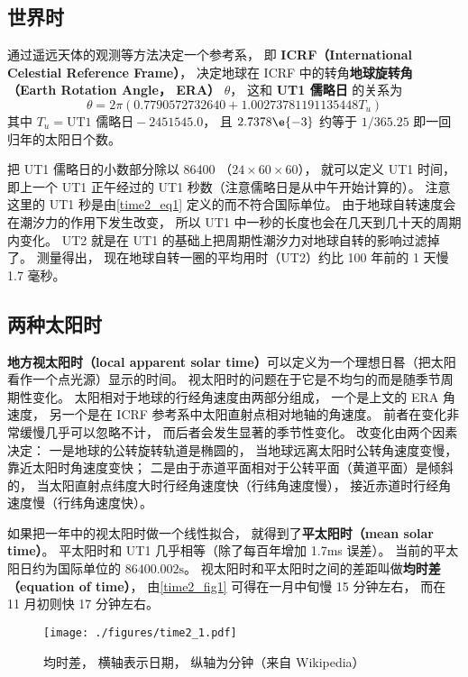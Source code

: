 

\subsection{世界时}
通过遥远天体的观测等方法决定一个参考系， 即 \textbf{ICRF（International Celestial Reference Frame）}， 决定地球在 ICRF 中的转角\textbf{地球旋转角（Earth Rotation Angle， ERA）} $\theta$， 这和 \textbf{UT1 儒略日} 的关系为
\begin{equation}\label{time2_eq1}
\theta = 2\pi(0.7790572732640 + 1.00273781191135448 T_u)
\end{equation}
其中 $T_u = \text{UT1 儒略日} - 2451545.0$， 且 $2.7378\e{-3}$ 约等于 $1/365.25$ 即一回归年的太阳日个数。

把 UT1 儒略日的小数部分除以 86400 （$24\times 60\times 60$）， 就可以定义 UT1 时间， 即上一个 UT1 正午经过的 UT1 秒数（注意儒略日是从中午开始计算的）。 注意这里的 UT1 秒是由\autoref{time2_eq1} 定义的而不符合国际单位。 由于地球自转速度会在潮汐力的作用下发生改变， 所以 UT1 中一秒的长度也会在几天到几十天的周期内变化。 UT2 就是在 UT1 的基础上把周期性潮汐力对地球自转的影响过滤掉了。 测量得出， 现在地球自转一圈的平均用时（UT2）约比 100 年前的 1 天慢 1.7 毫秒。

\subsection{两种太阳时}
\textbf{地方视太阳时（local apparent solar time）}可以定义为一个理想日晷（把太阳看作一个点光源）显示的时间。 视太阳时的问题在于它是不均匀的而是随季节周期性变化。 太阳相对于地球的行经角速度由两部分组成， 一个是上文的 ERA 角速度， 另一个是在 ICRF 参考系中太阳直射点相对地轴的角速度。 前者在变化非常缓慢几乎可以忽略不计， 而后者会发生显著的季节性变化。 改变化由两个因素决定： 一是地球的公转旋转轨道是椭圆的， 当地球远离太阳时公转角速度变慢， 靠近太阳时角速度变快； 二是由于赤道平面相对于公转平面（黄道平面）是倾斜的， 当太阳直射点纬度大时行经角速度快（行纬角速度慢）， 接近赤道时行经角速度慢（行纬角速度快）。

如果把一年中的视太阳时做一个线性拟合， 就得到了\textbf{平太阳时（mean solar time）}。 平太阳时和 UT1 几乎相等（除了每百年增加 1.7ms 误差）。 当前的平太阳日约为国际单位的 $86400.002\mathrm{s}$。 视太阳时和平太阳时之间的差距叫做\textbf{均时差（equation of time）}， 由\autoref{time2_fig1} 可得在一月中旬慢 15 分钟左右， 而在 11 月初则快 17 分钟左右。

\begin{figure}[ht]
\centering
\texttt{[image: ./figures/time2\_1.pdf]}
\caption{均时差， 横轴表示日期， 纵轴为分钟（来自 Wikipedia）} \label{time2_fig1}
\end{figure}

